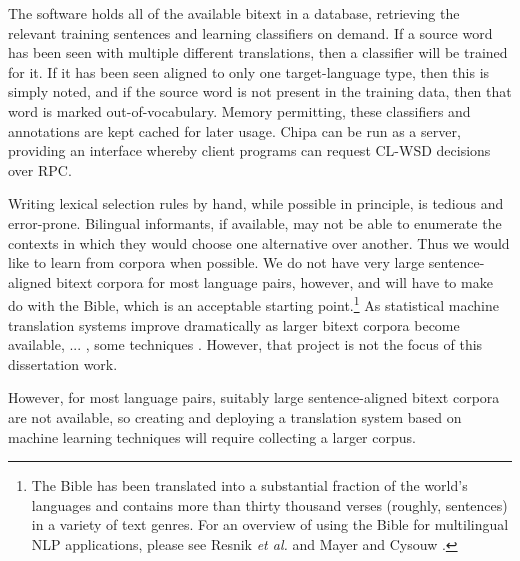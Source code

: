 The software holds all of the available bitext in a database, retrieving the
relevant training sentences and learning classifiers on demand.
If a source word has been seen with multiple different translations, then a
classifier will be trained for it. If it has been seen aligned to only one
target-language type, then this is simply noted, and if the source word is not
present in the training data, then that word is marked out-of-vocabulary.
Memory permitting, these classifiers and annotations are kept cached for later
usage. Chipa can be run as a server, providing an interface whereby client
programs can request CL-WSD decisions over RPC.









Writing lexical selection rules by hand, while possible in principle, is
tedious and error-prone.
Bilingual informants, if available, may not be able to enumerate the contexts
in which they would choose one alternative over another. Thus we would like to
learn from corpora when possible.
We do not have very large sentence-aligned bitext corpora for most language
pairs, however, and will have to make do with the Bible, which is an acceptable
starting point.\footnote{The
Bible has been translated into a substantial fraction of the world's languages
and contains more than thirty thousand verses (roughly, sentences) in
a variety of text genres. For an overview of using the Bible for multilingual
NLP applications, please see Resnik \emph{et al.}
\cite{DBLP:journals/lre/ResnikOD99} and Mayer and Cysouw
\cite{MAYER14.220.L14-1215}.} As statistical machine translation systems
improve dramatically as larger bitext corpora become available, ... , some
techniques . However, that project is not the focus of this dissertation work.

However, for most language pairs, suitably large
sentence-aligned bitext corpora are not available,
so creating and deploying a
translation system based on machine learning techniques will require collecting
a larger corpus.

